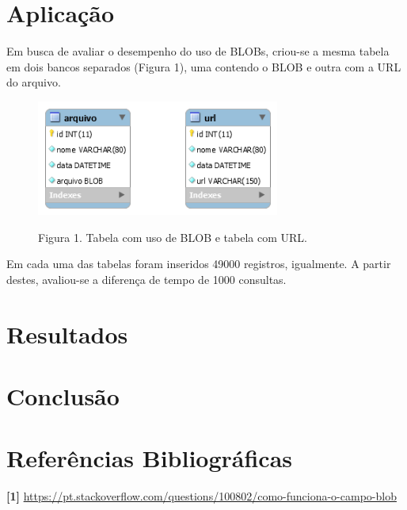 \documentclass[12pt,a4paper]{article}
\begin{document}
\section{Aplicação}
Em busca de avaliar o desempenho do uso de BLOBs, criou-se a mesma tabela em dois bancos separados (Figura 1), uma contendo o BLOB e outra com a URL do arquivo.

\begin{figure}[htb]
	\label{figura:tabelas}
	\centering
	\includegraphics[width=8cm]{recursos/imagens/tabelas.png} 
	
	Figura 1. Tabela com uso de BLOB e tabela com URL.
\end{figure}

Em cada uma das tabelas foram inseridos 49000 registros, igualmente. A partir destes, avaliou-se a diferença de tempo de 1000 consultas.



\section{Resultados}













\section{Conclusão}



\section{Referências Bibliográficas}
\noindent \textbf{[1]} \url {https://pt.stackoverflow.com/questions/100802/como-funciona-o-campo-blob}\\\vspace{0.2cm}
\end{document}
